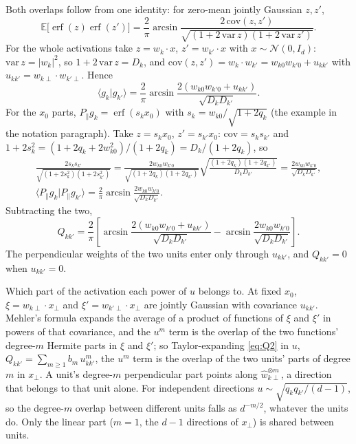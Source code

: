 \documentclass[11pt,a4paper]{article}
\newcommand{\E}{\mathbb E}
\newcommand{\erf}{\operatorname{erf}}
\begin{document}
Both overlaps follow from one identity: for zero-mean jointly Gaussian $z,z'$,
\begin{equation*}
  \E\big[\erf(z)\erf(z')\big]=\frac2\pi\arcsin\frac{2\,\mathrm{cov}(z,z')}{\sqrt{(1+2\,\mathrm{var}\,z)(1+2\,\mathrm{var}\,z')}} .
\end{equation*}
For the whole activations take $z=w_k\cdot x$, $z'=w_{k'}\cdot x$ with $x\sim\mathcal N(0,I_d)$:
$\mathrm{var}\,z=|w_k|^2$, so $1+2\,\mathrm{var}\,z=D_k$, and $\mathrm{cov}(z,z')=w_k\cdot w_{k'}=w_{k0}w_{k'0}+u_{kk'}$ with
$u_{kk'}=w_{k\perp}\cdot w_{k'\perp}$. Hence
\begin{equation*}
  \langle g_k|g_{k'}\rangle=\frac2\pi\arcsin\frac{2(w_{k0}w_{k'0}+u_{kk'})}{\sqrt{D_kD_{k'}}} .
\end{equation*}
For the $x_0$ parts, $P_\parallel g_k=\erf(s_kx_0)$ with $s_k=w_{k0}/\sqrt{1+2q_k}$ (the example in the notation
paragraph). Take $z=s_kx_0$, $z'=s_{k'}x_0$: $\mathrm{cov}=s_ks_{k'}$ and
$1+2s_k^2=(1+2q_k+2w_{k0}^2)/(1+2q_k)=D_k/(1+2q_k)$, so
\begin{gather*}
  \frac{2s_ks_{k'}}{\sqrt{(1+2s_k^2)(1+2s_{k'}^2)}}
  =\frac{2w_{k0}w_{k'0}}{\sqrt{(1+2q_k)(1+2q_{k'})}}\sqrt{\frac{(1+2q_k)(1+2q_{k'})}{D_kD_{k'}}}
  =\frac{2w_{k0}w_{k'0}}{\sqrt{D_kD_{k'}}},\\
  \langle P_\parallel g_k|P_\parallel g_{k'}\rangle=\frac2\pi\arcsin\frac{2w_{k0}w_{k'0}}{\sqrt{D_kD_{k'}}} .
\end{gather*}
Subtracting the two,
\begin{equation}
  Q_{kk'}=\frac{2}{\pi}\left[\arcsin\frac{2(w_{k0}w_{k'0}+u_{kk'})}{\sqrt{D_kD_{k'}}}
  -\arcsin\frac{2w_{k0}w_{k'0}}{\sqrt{D_kD_{k'}}}\right].
  \label{eq:Q2}
\end{equation}
The perpendicular weights of the two units enter only through $u_{kk'}$, and $Q_{kk'}=0$ when $u_{kk'}=0$.

Which part of the activation each power of $u$ belongs to. At fixed $x_0$, $\xi=w_{k\perp}\cdot x_\perp$ and
$\xi'=w_{k'\perp}\cdot x_\perp$ are jointly Gaussian with covariance $u_{kk'}$. Mehler's formula expands the average of a
product of functions of $\xi$ and $\xi'$ in powers of that covariance, and the $u^m$ term is the overlap of the two
functions' degree-$m$ Hermite parts in $\xi$ and $\xi'$; so Taylor-expanding \eqref{eq:Q2} in $u$,
$Q_{kk'}=\sum_{m\ge1}b_m\,u_{kk'}^m$, the $u^m$ term is the overlap of the two units' parts of degree $m$ in $x_\perp$. A
unit's degree-$m$ perpendicular part points along $\hat w_{k\perp}^{\otimes m}$, a direction that belongs to that unit
alone. For independent directions $u\sim\sqrt{q_kq_{k'}/(d-1)}$, so the degree-$m$ overlap between different units falls
as $d^{-m/2}$, whatever the units do. Only the linear part ($m=1$, the $d-1$ directions of $x_\perp$) is shared between
units.
\end{document}
